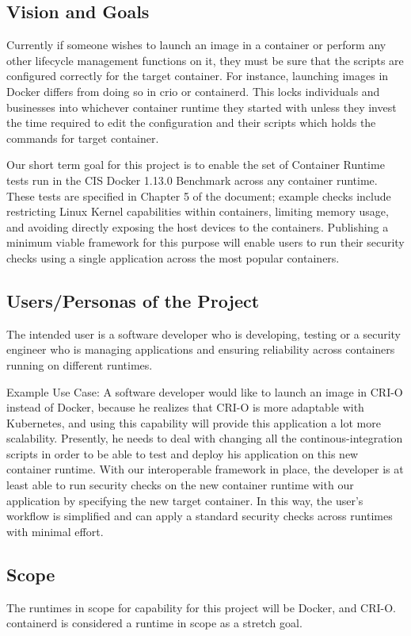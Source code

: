 \subsection{Vision and Goals}
Currently if someone wishes to launch an image in a container or perform any other lifecycle management functions on it, they must be sure that the scripts are configured correctly for the target container. For instance, launching images in Docker differs from doing so in crio or containerd. This locks individuals and businesses into whichever container runtime they started with unless they invest the time required to edit the configuration and their scripts which holds the commands for target container.

Our short term goal for this project is to enable the set of Container Runtime tests run in the CIS Docker 1.13.0 Benchmark across any container runtime. These tests are specified in Chapter 5 of the document; example checks include restricting Linux Kernel capabilities within containers, limiting memory usage, and avoiding directly exposing the host devices to the containers. Publishing a minimum viable framework for this purpose will enable users to run their security checks using a single application across the most popular containers.


\subsection*{Users/Personas of the Project}
The intended user is a software developer who is developing, testing or a security engineer who is managing applications and ensuring reliability across containers running on different runtimes.

Example Use Case: A software developer would like to launch an image in CRI-O instead of Docker, because he realizes that CRI-O is more adaptable with Kubernetes, and using this capability will provide this application a lot more scalability. Presently, he needs to deal with changing all the continous-integration scripts in order to be able to test and deploy his application on this new container runtime. With our interoperable framework in place, the developer is at least able to run security checks on the new container runtime with our application by specifying the new target container. In this way, the user's workflow is simplified and can apply a standard security checks across runtimes with minimal effort.

\subsection*{Scope}
The runtimes in scope for capability for this project will be Docker, and CRI-O. containerd is considered a runtime in scope as a stretch goal.

